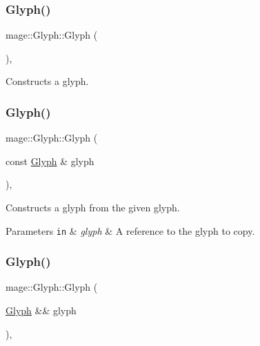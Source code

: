 \subsubsection{\texorpdfstring{Glyph()}{Glyph()}\hspace{0.1cm}{\footnotesize\ttfamily [1/3]}}
{\footnotesize\ttfamily mage\+::\+Glyph\+::\+Glyph (\begin{DoxyParamCaption}{ }\end{DoxyParamCaption})\hspace{0.3cm}{\ttfamily [default]}, {\ttfamily [noexcept]}}

Constructs a glyph. \hypertarget{structmage_1_1_glyph_a6915f88bb426261e67f243629509f9a9}{}\label{structmage_1_1_glyph_a6915f88bb426261e67f243629509f9a9} 
\subsubsection{\texorpdfstring{Glyph()}{Glyph()}\hspace{0.1cm}{\footnotesize\ttfamily [2/3]}}
{\footnotesize\ttfamily mage\+::\+Glyph\+::\+Glyph (\begin{DoxyParamCaption}\item[{const \hyperlink{structmage_1_1_glyph}{Glyph} \&}]{glyph }\end{DoxyParamCaption})\hspace{0.3cm}{\ttfamily [default]}, {\ttfamily [noexcept]}}

Constructs a glyph from the given glyph.


\begin{DoxyParams}[1]{Parameters}
\mbox{\tt in}  & {\em glyph} & A reference to the glyph to copy. \\
\hline
\end{DoxyParams}
\hypertarget{structmage_1_1_glyph_a823494adc2f56bee49c3f9e498638f60}{}\label{structmage_1_1_glyph_a823494adc2f56bee49c3f9e498638f60} 
\subsubsection{\texorpdfstring{Glyph()}{Glyph()}\hspace{0.1cm}{\footnotesize\ttfamily [3/3]}}
{\footnotesize\ttfamily mage\+::\+Glyph\+::\+Glyph (\begin{DoxyParamCaption}\item[{\hyperlink{structmage_1_1_glyph}{Glyph} \&\&}]{glyph }\end{DoxyParamCaption})\hspace{0.3cm}{\ttfamily [default]}, {\ttfamily [noexcept]}}


